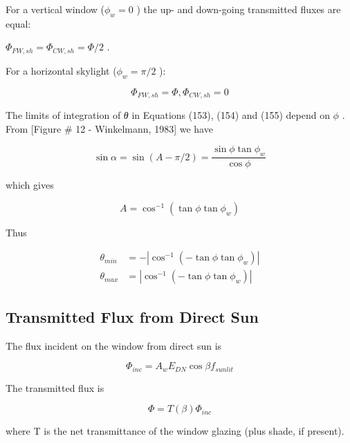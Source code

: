 For a vertical window (\({\phi_w} = 0\) ) the up- and down-going transmitted fluxes are equal:

\({\Phi_{FW,sh}} = {\Phi_{CW,sh}} = \Phi /2\) .

For a horizontal skylight (\({\phi_w} = \pi /2\) ):

\begin{equation}
{\Phi_{FW,sh}} = \Phi ,{\Phi_{CW,sh}} = 0
\end{equation}

The limits of integration of \emph{θ} in Equations (153), (154) and (155) depend on \(\phi\) . From {[}Figure \# 12 - Winkelmann, 1983{]} we have

\begin{equation}
\sin \alpha  = \sin (A - \pi /2) = \frac{{\sin \phi \tan {\phi_w}}}{{\cos \phi }}
\end{equation}

which gives

\begin{equation}
A = {\cos ^{ - 1}}(\tan \phi \tan {\phi_w})
\end{equation}

Thus

\begin{equation}
\begin{array}{rl}
    \theta_{min} & =  - \left| \cos^{-1}(-\tan\phi\tan\phi_w) \right| \\
    \theta_{max} & = \left| \cos^{-1}(-\tan\phi\tan\phi_w) \right| 
\end{array}
\end{equation}

\subsection{Transmitted Flux from Direct Sun}\label{transmitted-flux-from-direct-sun}

The flux incident on the window from direct sun is

\begin{equation}
{\Phi_{inc}} = {A_w}{E_{DN}}\cos \beta {f_{sunlit}}
\end{equation}

The transmitted flux is

\begin{equation}
\Phi  = T(\beta ){\Phi_{inc}}
\end{equation}

where T is the net transmittance of the window glazing (plus shade, if present).

